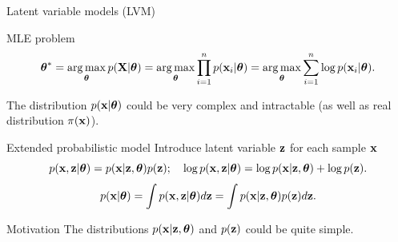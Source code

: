\begin{frame}{Latent variable models (LVM)}
	\begin{block}{MLE problem}
		\vspace{-0.5cm}
		\[
		\boldsymbol{\theta}^* = \operatorname*{arg\,max}_{\boldsymbol{\theta}} p(\mathbf{X} | \boldsymbol{\theta}) = \operatorname*{arg\,max}_{\boldsymbol{\theta}} \prod_{i=1}^n p(\mathbf{x}_i | \boldsymbol{\theta}) = \operatorname*{arg\,max}_{\boldsymbol{\theta}} \sum_{i=1}^n \log p(\mathbf{x}_i | \boldsymbol{\theta}).
		\]
		\vspace{-0.5cm}
	\end{block}
	The distribution $p(\mathbf{x} | \boldsymbol{\theta})$ could be very complex and intractable (as well as real distribution $\pi(\mathbf{x})$).
	\begin{block}{Extended probabilistic model}
		Introduce latent variable $\mathbf{z}$ for each sample $\mathbf{x}$
		\[
		p(\mathbf{x}, \mathbf{z} | \boldsymbol{\theta}) = p(\mathbf{x} | \mathbf{z}, \boldsymbol{\theta}) p(\mathbf{z}); \quad 
		\log p(\mathbf{x}, \mathbf{z} | \boldsymbol{\theta}) = \log p(\mathbf{x} | \mathbf{z}, \boldsymbol{\theta}) + \log p(\mathbf{z}).
		\]
		\[
		p(\mathbf{x} | \boldsymbol{\theta}) = \int p(\mathbf{x}, \mathbf{z} | \boldsymbol{\theta}) d\mathbf{z} = \int p(\mathbf{x} | \mathbf{z}, \boldsymbol{\theta}) p(\mathbf{z}) d\mathbf{z}.
		\]
	\end{block}
	\vspace{-0.3cm}
	\begin{block}{Motivation}
		The distributions $p(\mathbf{x} | \mathbf{z}, \boldsymbol{\theta})$ and $p(\mathbf{z})$ could be quite simple.
	\end{block}
\end{frame}
